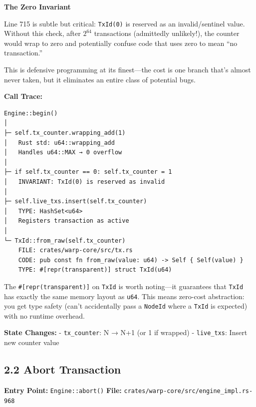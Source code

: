 \documentclass[11pt]{book}
\begin{document}
\begin{watchout}
\textbf{The Zero Invariant}

Line 715 is subtle but critical: \texttt{TxId(0)} is reserved as an invalid/sentinel value. Without this check, after $2^{64}$ transactions (admittedly unlikely!), the counter would wrap to zero and potentially confuse code that uses zero to mean ``no transaction.''

This is defensive programming at its finest---the cost is one branch that's almost never taken, but it eliminates an entire class of potential bugs.
\end{watchout}

\textbf{Call Trace:}

\begin{verbatim}
Engine::begin()
│
├─ self.tx_counter.wrapping_add(1)
│   Rust std: u64::wrapping_add
│   Handles u64::MAX → 0 overflow
│
├─ if self.tx_counter == 0: self.tx_counter = 1
│   INVARIANT: TxId(0) is reserved as invalid
│
├─ self.live_txs.insert(self.tx_counter)
│   TYPE: HashSet<u64>
│   Registers transaction as active
│
└─ TxId::from_raw(self.tx_counter)
    FILE: crates/warp-core/src/tx.rs
    CODE: pub const fn from_raw(value: u64) -> Self { Self(value) }
    TYPE: #[repr(transparent)] struct TxId(u64)
\end{verbatim}

\begin{tourguide}
The \texttt{\#[repr(transparent)]} on \texttt{TxId} is worth noting---it guarantees that \texttt{TxId} has exactly the same memory layout as \texttt{u64}. This means zero-cost abstraction: you get type safety (can't accidentally pass a \texttt{NodeId} where a \texttt{TxId} is expected) with no runtime overhead.
\end{tourguide}

\textbf{State Changes:} - \texttt{tx\_counter}: N → N+1 (or 1 if
wrapped) - \texttt{live\_txs}: Insert new counter value

\subsection{2.2 Abort Transaction}\label{abort-transaction}

\textbf{Entry Point:} \texttt{Engine::abort()} \textbf{File:}
\texttt{crates/warp-core/src/engine\_impl.rs-968}
\end{document}
